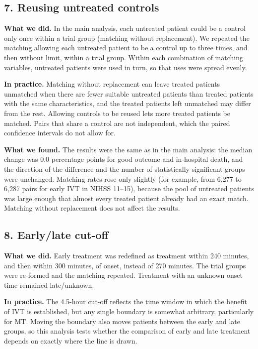 \clearpage

\subsection*{7. Reusing untreated controls}

\textbf{What we did.} In the main analysis, each untreated patient could be a control only once within a trial group (matching without replacement). We repeated the matching allowing each untreated patient to be a control up to three times, and then without limit, within a trial group. Within each combination of matching variables, untreated patients were used in turn, so that uses were spread evenly.

\textbf{In practice.} Matching without replacement can leave treated patients unmatched when there are fewer suitable untreated patients than treated patients with the same characteristics, and the treated patients left unmatched may differ from the rest. Allowing controls to be reused lets more treated patients be matched. Pairs that share a control are not independent, which the paired confidence intervals do not allow for.

\textbf{What we found.} The results were the same as in the main analysis: the median change was 0.0 percentage points for good outcome and in-hospital death, and the direction of the difference and the number of statistically significant groups were unchanged. Matching rates rose only slightly (for example, from 6,277 to 6,287 pairs for early IVT in NIHSS 11--15), because the pool of untreated patients was large enough that almost every treated patient already had an exact match. Matching without replacement does not affect the results.

\subsection*{8. Early/late cut-off}

\textbf{What we did.} Early treatment was redefined as treatment within 240 minutes, and then within 300 minutes, of onset, instead of 270 minutes. The trial groups were re-formed and the matching repeated. Treatment with an unknown onset time remained late/unknown.

\textbf{In practice.} The 4.5-hour cut-off reflects the time window in which the benefit of IVT is established, but any single boundary is somewhat arbitrary, particularly for MT. Moving the boundary also moves patients between the early and late groups, so this analysis tests whether the comparison of early and late treatment depends on exactly where the line is drawn.

